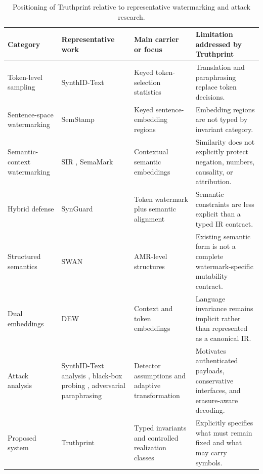 \documentclass[11pt]{article}
\begin{document}
\begin{table}[t]
\centering
\caption{Positioning of Truthprint relative to representative watermarking and attack research.}
\label{tab:positioning}
\begin{tabularx}{\textwidth}{@{}>{\raggedright\arraybackslash}p{2.5cm}>{\raggedright\arraybackslash}p{2.9cm}>{\raggedright\arraybackslash}p{3.0cm}X@{}}
\toprule
Category & Representative work & Main carrier or focus & Limitation addressed by Truthprint \\
\midrule
Token-level sampling & SynthID-Text \cite{dathathri2024synthid} & Keyed token-selection statistics & Translation and paraphrasing replace token decisions. \\
Sentence-space watermarking & SemStamp \cite{hou2024semstamp} & Keyed sentence-embedding regions & Embedding regions are not typed by invariant category. \\
Semantic-context watermarking & SIR \cite{liu2023sir}, SemaMark \cite{ren2024semmark} & Contextual semantic embeddings & Similarity does not explicitly protect negation, numbers, causality, or attribution. \\
Hybrid defense & SynGuard \cite{han2025synguard} & Token watermark plus semantic alignment & Semantic constraints are less explicit than a typed IR contract. \\
Structured semantics & SWAN \cite{ye2026swan} & AMR-level structures & Existing semantic form is not a complete watermark-specific mutability contract. \\
Dual embeddings & DEW \cite{schaefer2026dew} & Context and token embeddings & Language invariance remains implicit rather than represented as a canonical IR. \\
Attack analysis & SynthID-Text analysis \cite{omidi2026synthidanalysis}, black-box probing \cite{gloaguen2024blackbox}, adversarial paraphrasing \cite{cheng2025adversarial} & Detector assumptions and adaptive transformation & Motivates authenticated payloads, conservative interfaces, and erasure-aware decoding. \\
Proposed system & Truthprint & Typed invariants and controlled realization classes & Explicitly specifies what must remain fixed and what may carry symbols. \\
\bottomrule
\end{tabularx}
\end{table}
\end{document}
